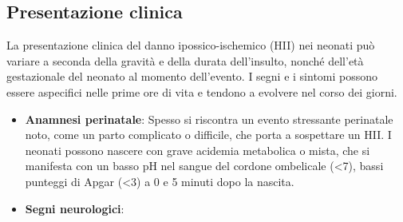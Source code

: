 \subsection{Presentazione clinica}

La presentazione clinica del danno ipossico-ischemico (HII) nei neonati può variare a seconda della gravità e della durata dell'insulto, nonché dell'età gestazionale del neonato al momento dell'evento. I segni e i sintomi possono essere aspecifici nelle prime ore di vita e tendono a evolvere nel corso dei giorni.

\begin{itemize}
	\tightlist
	\item
	\textbf{Anamnesi perinatale}: Spesso si riscontra un evento stressante perinatale noto, come un parto complicato o difficile, che porta a sospettare un HII. I neonati possono nascere con grave acidemia metabolica o mista, che si manifesta con un basso pH nel sangue del cordone ombelicale (\textless7), bassi punteggi di Apgar (\textless3) a 0 e 5 minuti dopo la nascita.
	\item
	\textbf{Segni neurologici}:
	

\end{itemize}
